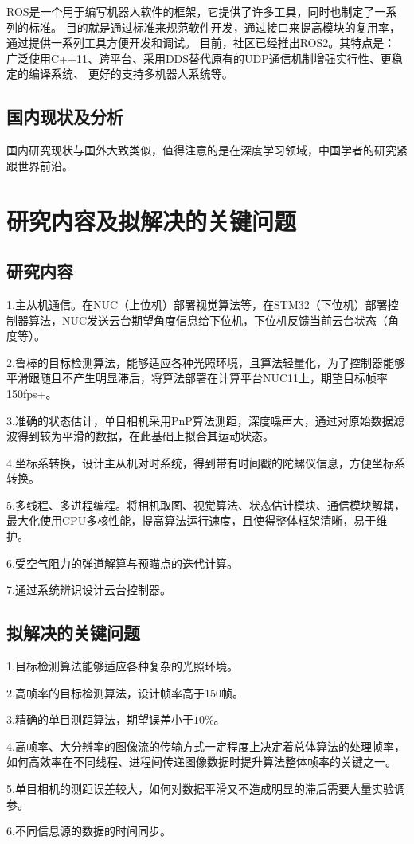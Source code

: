 ROS是一个用于编写机器人软件的框架，它提供了许多工具，同时也制定了一系列的标准。
目的就是通过标准来规范软件开发，通过接口来提高模块的复用率，通过提供一系列工具方便开发和调试。
目前，社区已经推出ROS2。其特点是：
广泛使用C++11、跨平台、采用DDS替代原有的UDP通信机制增强实行性、更稳定的编译系统、
更好的支持多机器人系统等。


\subsection{国内现状及分析}
国内研究现状与国外大致类似，值得注意的是在深度学习领域，中国学者的研究紧跟世界前沿。
\section{研究内容及拟解决的关键问题}
\subsection{研究内容}
1.主从机通信。在NUC（上位机）部署视觉算法等，在STM32（下位机）部署控制器算法，NUC发送云台期望角度信息给下位机，下位机反馈当前云台状态（角度等）。\par
2.鲁棒的目标检测算法，能够适应各种光照环境，且算法轻量化，为了控制器能够平滑跟随且不产生明显滞后，将算法部署在计算平台NUC11上，期望目标帧率150fps+。 \par
3.准确的状态估计，单目相机采用PnP算法测距，深度噪声大，通过对原始数据滤波得到较为平滑的数据，在此基础上拟合其运动状态。 \par
4.坐标系转换，设计主从机对时系统，得到带有时间戳的陀螺仪信息，方便坐标系转换。 \par
5.多线程、多进程编程。将相机取图、视觉算法、状态估计模块、通信模块解耦，最大化使用CPU多核性能，提高算法运行速度，且使得整体框架清晰，易于维护。\par
6.受空气阻力的弹道解算与预瞄点的迭代计算。\par
7.通过系统辨识设计云台控制器。\par
\subsection{拟解决的关键问题}
1.目标检测算法能够适应各种复杂的光照环境。\par
2.高帧率的目标检测算法，设计帧率高于150帧。 \par
3.精确的单目测距算法，期望误差小于$10\%$。 \par
4.高帧率、大分辨率的图像流的传输方式一定程度上决定着总体算法的处理帧率，如何高效率在不同线程、进程间传递图像数据时提升算法整体帧率的关键之一。 \par
5.单目相机的测距误差较大，如何对数据平滑又不造成明显的滞后需要大量实验调参。 \par
6.不同信息源的数据的时间同步。\par

